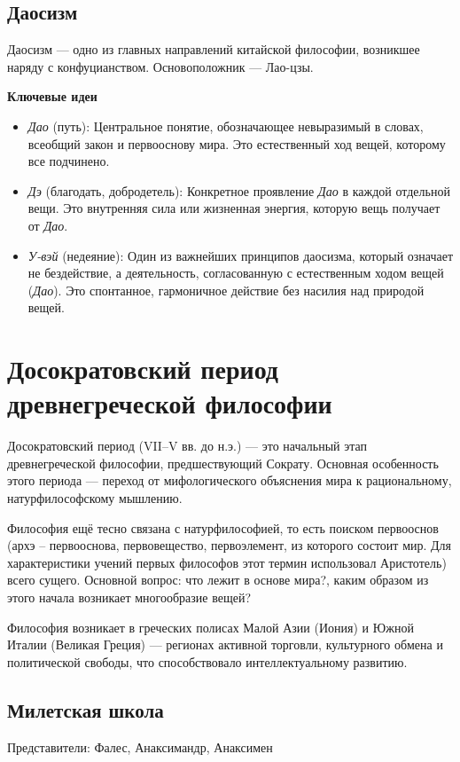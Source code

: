 \documentclass[12pt,a4paper]{article}
\begin{document}
	\subsection{Даосизм} Даосизм --- одно из главных направлений китайской философии, возникшее наряду с конфуцианством. Основоположник --- Лао-цзы.
	
	\textbf{Ключевые идеи}
	\begin{itemize}
		\item \textit{Дао} (путь): Центральное понятие, обозначающее невыразимый в словах, всеобщий закон и первооснову мира. Это естественный ход вещей, которому все подчинено.
		\item \textit{Дэ} (благодать, добродетель): Конкретное проявление \textit{Дао} в каждой отдельной вещи. Это внутренняя сила или жизненная энергия, которую вещь получает от \textit{Дао}.
		\item \textit{У-вэй} (недеяние): Один из важнейших принципов даосизма, который означает не бездействие, а деятельность, согласованную с естественным ходом вещей (\textit{Дао}). Это спонтанное, гармоничное действие без насилия над природой вещей.
	\end{itemize}
	

	\section{Досократовский период древнегреческой философии~\checkmark}	
	Досократовский период (VII–V вв. до н.э.) — это начальный этап древнегреческой философии, предшествующий Сократу. Основная особенность этого периода — переход от мифологического объяснения мира к рациональному, натурфилософскому мышлению.
	
	Философия ещё тесно связана с натурфилософией, то есть поиском первооснов (архэ -- первооснова, первовещество, первоэлемент, из которого состоит мир. Для характеристики учений первых философов этот термин использовал Аристотель) всего сущего. Основной вопрос: что лежит в основе мира?, каким образом из этого начала возникает многообразие вещей?
	
	Философия возникает в греческих полисах Малой Азии (Иония) и Южной Италии (Великая Греция) — регионах активной торговли, культурного обмена и политической свободы, что способствовало интеллектуальному развитию.
	
	\subsection{Милетская школа}
	Представители: Фалес, Анаксимандр, Анаксимен
	
\end{document}
